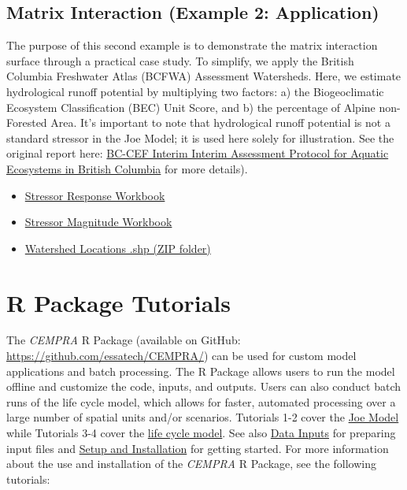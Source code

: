 \documentclass[
  letterpaper,
  DIV=11,
  numbers=noendperiod]{scrreprt}
\providecommand{\tightlist}{%
  \setlength{\itemsep}{0pt}\setlength{\parskip}{0pt}}
\begin{document}
\section{Matrix Interaction (Example 2:
Application)}\label{matrix-interaction-example-2-application}

The purpose of this second example is to demonstrate the matrix
interaction surface through a practical case study. To simplify, we
apply the British Columbia Freshwater Atlas (BCFWA) Assessment
Watersheds. Here, we estimate hydrological runoff potential by
multiplying two factors: a) the Biogeoclimatic Ecosystem Classification
(BEC) Unit Score, and b) the percentage of Alpine non-Forested Area.
It's important to note that hydrological runoff potential is not a
standard stressor in the Joe Model; it is used here solely for
illustration. See the original report here:
\href{https://www2.gov.bc.ca/assets/gov/environment/natural-resource-stewardship/cumulative-effects/protocols/cef-aquatic-ecosystems-protocol-dec2020.pdf}{BC-CEF
Interim Interim Assessment Protocol for Aquatic Ecosystems in British
Columbia} for more details).

\begin{itemize}
\tightlist
\item
  \href{./sample_data/coldwater_matrix/coldwater_bc_sr_matrix.xlsx}{Stressor
  Response Workbook}
\item
  \href{./sample_data/coldwater_matrix/coldwater_bc_stressor_magnitude.xlsx}{Stressor
  Magnitude Workbook}
\item
  \href{./sample_data/coldwater_matrix/coldwater_bc_locations.zip}{Watershed
  Locations .shp (ZIP folder)}
\end{itemize}

\section{}\label{09_case_study_applications-09_case_study_applications-nicola-basin-salmonids}


\chapter{R Package Tutorials}\label{r-package-tutorials}

The \emph{CEMPRA} R Package (available on GitHub:
\url{https://github.com/essatech/CEMPRA/}) can be used for custom model
applications and batch processing. The R Package allows users to run the
model offline and customize the code, inputs, and outputs. Users can
also conduct batch runs of the life cycle model, which allows for
faster, automated processing over a large number of spatial units and/or
scenarios. Tutorials 1-2 cover the
\hyperref[modelling-pathways-and-assessment-endpoints]{Joe Model} while
Tutorials 3-4 cover the
\hyperref[life-cycle-model-population-model-overview]{life cycle model}.
See also \hyperref[data-inputs]{Data Inputs} for preparing input files
and \hyperref[setup-and-installation]{Setup and Installation} for
getting started. For more information about the use and installation of
the \emph{CEMPRA} R Package, see the following tutorials:
\end{document}

